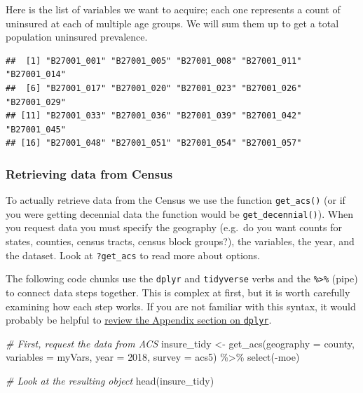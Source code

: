 \documentclass[
]{book}
\newenvironment{Shaded}{\begin{snugshade}}{\end{snugshade}}
\newcommand{\AttributeTok}[1]{\textcolor[rgb]{0.77,0.63,0.00}{#1}}
\newcommand{\CommentTok}[1]{\textcolor[rgb]{0.56,0.35,0.01}{\textit{#1}}}
\newcommand{\DecValTok}[1]{\textcolor[rgb]{0.00,0.00,0.81}{#1}}
\newcommand{\FunctionTok}[1]{\textcolor[rgb]{0.00,0.00,0.00}{#1}}
\newcommand{\NormalTok}[1]{#1}
\newcommand{\OtherTok}[1]{\textcolor[rgb]{0.56,0.35,0.01}{#1}}
\newcommand{\SpecialCharTok}[1]{\textcolor[rgb]{0.00,0.00,0.00}{#1}}
\newcommand{\StringTok}[1]{\textcolor[rgb]{0.31,0.60,0.02}{#1}}
\begin{document}
Here is the list of variables we want to acquire; each one represents a count of uninsured at each of multiple age groups. We will sum them up to get a total population uninsured prevalence.

\begin{verbatim}
##  [1] "B27001_001" "B27001_005" "B27001_008" "B27001_011" "B27001_014"
##  [6] "B27001_017" "B27001_020" "B27001_023" "B27001_026" "B27001_029"
## [11] "B27001_033" "B27001_036" "B27001_039" "B27001_042" "B27001_045"
## [16] "B27001_048" "B27001_051" "B27001_054" "B27001_057"
\end{verbatim}

\hypertarget{retrieving-data-from-census}{%
\subsubsection{Retrieving data from Census}\label{retrieving-data-from-census}}

To actually retrieve data from the Census we use the function \texttt{get\_acs()} (or if you were getting decennial data the function would be \texttt{get\_decennial()}). When you request data you must specify the geography (e.g.~do you want counts for states, counties, census tracts, census block groups?), the variables, the year, and the dataset. Look at \texttt{?get\_acs} to read more about options.

The following code chunks use the \texttt{dplyr} and \texttt{tidyverse} verbs and the \texttt{\%\textgreater{}\%} (pipe) to connect data steps together. This is complex at first, but it is worth carefully examining how each step works. If you are not familiar with this syntax, it would probably be helpful to \protect\hyperlink{dplyr}{review the Appendix section on \texttt{dplyr}}.

\begin{Shaded}
\begin{Highlighting}[]
\CommentTok{\# First, request the data from ACS}
\NormalTok{insure\_tidy }\OtherTok{\textless{}{-}} \FunctionTok{get\_acs}\NormalTok{(}\AttributeTok{geography =} \StringTok{\textquotesingle{}county\textquotesingle{}}\NormalTok{,}
                     \AttributeTok{variables =}\NormalTok{ myVars,}
                     \AttributeTok{year =} \DecValTok{2018}\NormalTok{, }
                     \AttributeTok{survey =} \StringTok{\textquotesingle{}acs5\textquotesingle{}}\NormalTok{) }\SpecialCharTok{\%\textgreater{}\%}
  \FunctionTok{select}\NormalTok{(}\SpecialCharTok{{-}}\NormalTok{moe)}

\CommentTok{\# Look at the resulting object}
\FunctionTok{head}\NormalTok{(insure\_tidy)}
\end{Highlighting}
\end{Shaded}
\end{document}
